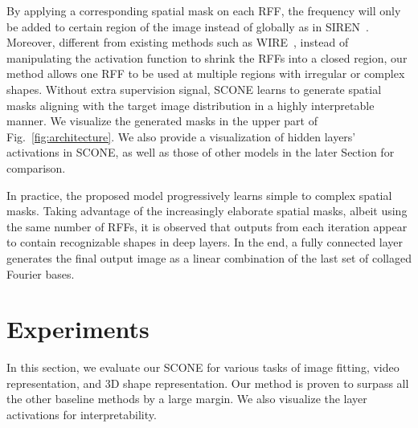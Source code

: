 \documentclass[letterpaper]{article} %
\begin{document}
By applying a corresponding spatial mask on each RFF, the frequency will only be added to certain region of the image instead of globally as in SIREN~\cite{2020siren}. Moreover, different from existing methods such as WIRE~\cite{saragadam2023wire}, instead of manipulating the activation function to shrink the RFFs into a closed region, our method allows one RFF to be used at multiple regions with irregular or complex shapes. Without extra supervision signal, SCONE learns to generate spatial masks aligning with the target image distribution in a highly interpretable manner. We visualize the generated masks in the upper part of Fig.~\ref{fig:architecture}. We also provide a visualization of hidden layers' activations in SCONE, as well as those of other models in the later Section for comparison.

In practice, the proposed model progressively learns simple to complex spatial masks. Taking advantage of the increasingly elaborate spatial masks, albeit using the same number of RFFs, it is observed that outputs from each iteration appear to contain recognizable shapes in deep layers. In the end, a fully connected layer generates the final output image as a linear combination of the last set of collaged Fourier bases.

\section{Experiments}
In this section, we evaluate our SCONE for various tasks of image fitting, video representation, and 3D shape representation. Our method is proven to surpass all the other baseline methods by a large margin. We also visualize the layer activations for interpretability.

\label{sec:experiments}
\end{document}

